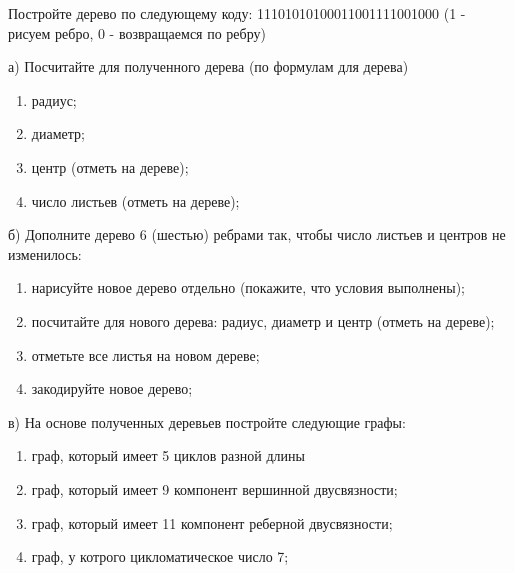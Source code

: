 \question 
Постройте дерево по следующему коду: 11101010100011001111001000 (1 - рисуем ребро, 0 - возвращаемся по ребру)

а) Посчитайте для полученного дерева (по формулам для дерева)
\begin{enumerate}
\item радиус;
\item диаметр;
\item центр (отметь на дереве);
\item число листьев (отметь на дереве);
\end{enumerate}

б) Дополните дерево 6 (шестью) ребрами так, чтобы число листьев и центров не изменилось:
\begin{enumerate}
\item нарисуйте новое дерево отдельно (покажите, что условия выполнены);
\item посчитайте для нового дерева: радиус, диаметр и центр (отметь на дереве);
\item отметьте все листья на  новом дереве;
\item закодируйте новое дерево;
\end{enumerate}

в) На основе полученных деревьев  постройте следующие графы:
\begin{enumerate}
\item граф, который имеет 5 циклов разной длины
\item граф, который имеет 9 компонент вершинной двусвязности;
\item граф, который имеет 11 компонент реберной двусвязности;
\item граф, у котрого цикломатическое число 7;
\end{enumerate}